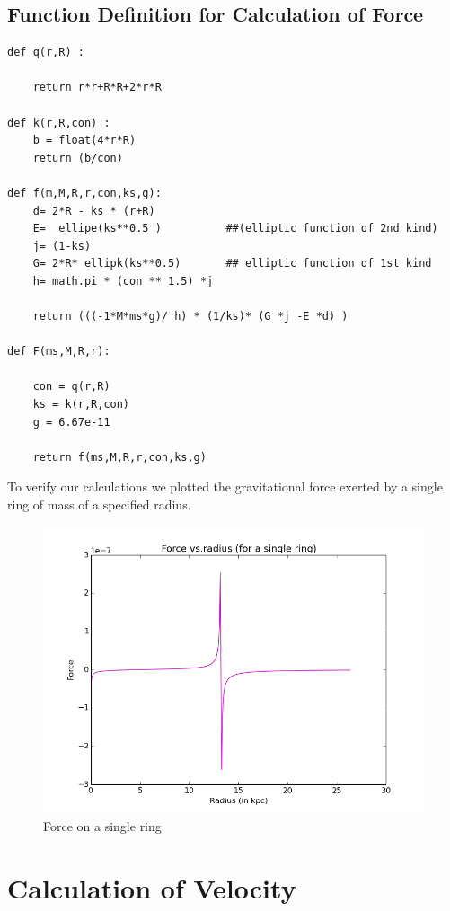 \subsection{Function Definition for Calculation of Force}
\begin{verbatim}
def q(r,R) :

    return r*r+R*R+2*r*R

def k(r,R,con) :
    b = float(4*r*R)
    return (b/con)

def f(m,M,R,r,con,ks,g):
    d= 2*R - ks * (r+R)
    E=  ellipe(ks**0.5 )          ##(elliptic function of 2nd kind)
    j= (1-ks)
    G= 2*R* ellipk(ks**0.5)       ## elliptic function of 1st kind
    h= math.pi * (con ** 1.5) *j

    return (((-1*M*ms*g)/ h) * (1/ks)* (G *j -E *d) )

def F(ms,M,R,r):

    con = q(r,R)
    ks = k(r,R,con)
    g = 6.67e-11

    return f(ms,M,R,r,con,ks,g)
\end{verbatim}
To verify our calculations we plotted the gravitational force exerted by a single ring of mass of a specified radius.
\begin{figure}[h]
\centering
\includegraphics[scale=0.5]{force41R} 
\caption{Force on a single ring }
\end{figure}



\section{Calculation of Velocity }

